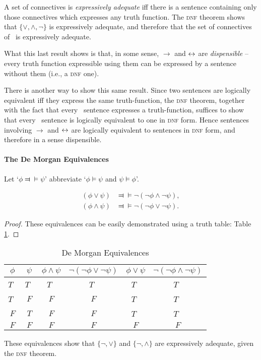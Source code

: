 A set of connectives is \emph{expressively adequate} iff there is a sentence containing only those connectives which expresses any truth function. The \textsc{\lowercase{DNF}} theorem shows that $\{\vee,\wedge,\neg\}$ is expressively adequate, and therefore that the set of connectives of \lone\ is expressively adequate.

What this last result shows is that, in some sense, $\to$ and $\leftrightarrow$ are \emph{dispensible} – every truth function expressible using them can be expressed by a sentence without them (i.e., a \textsc{\lowercase{DNF}} one).

There is another way to show this same result. Since two sentences are logically equivalent iff they express the same truth-function, the \textsc{\lowercase{DNF}} theorem, together with the fact that every \lone\ sentence expresses a truth-function, suffices to show that every \lone\ sentence is logically equivalent to one in \textsc{\lowercase{DNF}} form. Hence sentences involving $\to$ and $\leftrightarrow$ are logically equivalent to sentences in \textsc{\lowercase{DNF}} form, and therefore in a sense dispensible.



\paragraph{The De Morgan Equivalences}

Let `$\phi\Dashv\vDash\psi$' abbreviate `$\phi \vDash \psi$ and $\psi \vDash \phi$'.
\begin{theorem}
		\begin{align*}
			(\phi \vee \psi) &\Dashv\vDash \neg(\neg\phi \wedge \neg \psi),\\
	(\phi \wedge \psi) &\Dashv\vDash\neg(\neg\phi \vee \neg \psi).
		\end{align*}
\begin{proof}
	These equivalences can be easily demonstrated using a truth table: Table \ref{tone}.
\end{proof}
\end{theorem} \begin{table} \label{tone}
    \centering
    \begin{tabular}{cc|cc|cc}
    \toprule
        $\phi$ & $\psi$ &$\phi \wedge \psi$ & $\neg(\neg \phi \vee \neg \psi)$ & $\phi \vee \psi$ & $\neg (\neg \phi \wedge \neg \psi)$\\
        \midrule    
    $T$\ & $T$\ & $T$\ & $T$\ & $T$\ & $T$\ \\
    $T$\ & $F$ & $F$& $F$ & $T$\ & $T$\  \\
    $F$ & $T$& $F$ &$F$ & $T$\ & $T$\ \\
    $F$ & $F$& $F$ & $F$& $F$& $F$\\
    \bottomrule
    \end{tabular}
\caption{De Morgan Equivalences}
\end{table}
These equivalences show that $\{\neg,\vee\}$ and $\{\neg,\wedge\}$ are expressively adequate, given the \textsc{\lowercase{DNF}} theorem.

